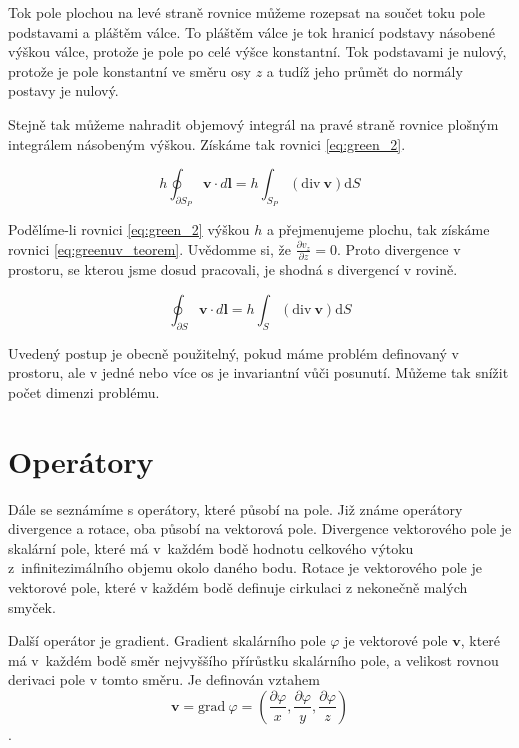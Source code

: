 \documentclass{book}
\newcommand{\vect}[1]{\boldsymbol{#1}}
\newcommand{\grad}{\mathrm{grad}}
\newcommand{\diverg}{\mathrm{div}}
\begin{document}
Tok pole plochou na levé straně rovnice můžeme rozepsat na součet toku pole podstavami a pláštěm válce.
To pláštěm válce je tok hranicí podstavy násobené výškou válce, protože je pole po celé výšce konstantní. Tok podstavami je nulový, protože je pole konstantní ve směru osy \(z\) a tudíž jeho průmět do normály postavy je nulový.

Stejně tak můžeme nahradit objemový integrál na pravé straně rovnice plošným integrálem násobeným výškou. Získáme tak rovnici \eqref{eq:green_2}.

\begin{equation}
\label{eq:green_2}
h \oint_{\partial S_P} \vect{v} \cdot d\vect{l} = h \int_{S_P} \left(\diverg \ \vect{v} \right) \mathrm{d}S
\end{equation}

Podělíme-li rovnici \eqref{eq:green_2} výškou \(h\) a přejmenujeme plochu, tak získáme rovnici \eqref{eq:greenuv_teorem}. Uvědomme si, že \(\frac{\partial v_z}{\partial z} = 0\).
Proto divergence v prostoru, se kterou jsme dosud pracovali, je shodná s divergencí v rovině.

\begin{equation}
\label{eq:greenuv_teorem}
\oint_{\partial S} \vect{v} \cdot d\vect{l} = h \int_S \left(\diverg \ \vect{v} \right) \mathrm{d}S
\end{equation}

Uvedený postup je obecně použitelný, pokud máme problém definovaný v prostoru, ale v jedné nebo více os je invariantní vůči posunutí. Můžeme tak snížit
počet dimenzi problému.


\section{Operátory}

Dále se seznámíme s operátory, které působí na pole. Již známe operátory divergence a rotace, oba působí na vektorová pole. Divergence vektorového pole
je skalární pole, které má v~každém bodě hodnotu celkového výtoku z~infinitezimálního objemu okolo daného bodu. Rotace je vektorového pole je vektorové
pole, které v každém bodě definuje cirkulaci z nekonečně malých smyček.

Další operátor je gradient. Gradient skalárního pole \(\varphi\) je vektorové pole \(\vect{v}\), které má v~každém bodě směr nejvyššího přírůstku skalárního pole, a velikost rovnou derivaci pole v tomto směru. Je definován vztahem
\[
\vect{v} = \grad \ \varphi = \left(\frac{\partial \varphi}{x}, \frac{\partial \varphi}{y}, \frac{\partial \varphi}{z}\right)
\].
\end{document}
